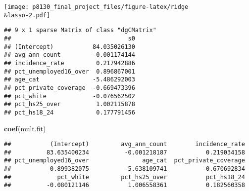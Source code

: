 \documentclass[]{article}
\newenvironment{Shaded}{\begin{snugshade}}{\end{snugshade}}
\newcommand{\KeywordTok}[1]{\textcolor[rgb]{0.13,0.29,0.53}{\textbf{#1}}}
\newcommand{\DataTypeTok}[1]{\textcolor[rgb]{0.13,0.29,0.53}{#1}}
\newcommand{\DecValTok}[1]{\textcolor[rgb]{0.00,0.00,0.81}{#1}}
\newcommand{\StringTok}[1]{\textcolor[rgb]{0.31,0.60,0.02}{#1}}
\newcommand{\CommentTok}[1]{\textcolor[rgb]{0.56,0.35,0.01}{\textit{#1}}}
\newcommand{\OperatorTok}[1]{\textcolor[rgb]{0.81,0.36,0.00}{\textbf{#1}}}
\newcommand{\NormalTok}[1]{#1}
\begin{document}
\texttt{[image: p8130\_final\_project\_files/figure-latex/ridge\\\&lasso-2.pdf]}

\begin{Shaded}
\end{Shaded}

\begin{verbatim}
## 9 x 1 sparse Matrix of class "dgCMatrix"
##                                 s0
## (Intercept)           84.035026130
## avg_ann_count         -0.001174144
## incidence_rate         0.217942886
## pct_unemployed16_over  0.896867001
## age_cat               -5.486292003
## pct_private_coverage  -0.669473396
## pct_white             -0.076562502
## pct_hs25_over          1.002115878
## pct_hs18_24            0.177791456
\end{verbatim}

\begin{Shaded}
\begin{Highlighting}[]
\KeywordTok{coef}\NormalTok{(mult.fit)}
\end{Highlighting}
\end{Shaded}

\begin{verbatim}
##           (Intercept)         avg_ann_count        incidence_rate 
##          83.635400234          -0.001218187           0.219034158 
## pct_unemployed16_over               age_cat  pct_private_coverage 
##           0.899382075          -5.638109741          -0.670692834 
##             pct_white         pct_hs25_over           pct_hs18_24 
##          -0.080121146           1.006558361           0.182560358
\end{verbatim}

\begin{Shaded}
\end{Shaded}
\end{document}
